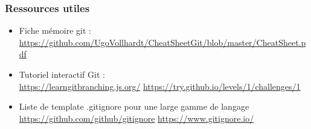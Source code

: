 \documentclass{beamer}
\begin{document}
\begin{frame}
\frametitle{Ressources utiles}
\begin{itemize}
	\item Fiche mémoire git : \\
	\url{https://github.com/UgoVollhardt/CheatSheetGit/blob/master/CheatSheet.pdf}
	\item Tutoriel interactif Git : \\
	\url{https://learngitbranching.js.org/}
	\url{https://try.github.io/levels/1/challenges/1}
	\item Liste de template .gitignore pour une large gamme de langage
	\url{https://github.com/github/gitignore}
	\url{https://www.gitignore.io/}
\end{itemize}


\end{frame}
\end{document}
